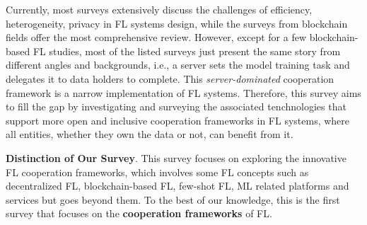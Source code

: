 Currently, most surveys extensively discuss the challenges of efficiency, heterogeneity, privacy in FL systems design, while the surveys from blockchain fields offer the most comprehensive review\textsuperscript{}. 
However, except for a few blockchain-based FL studies, most of the listed surveys just present the same story from different angles and backgrounds, i.e., a server sets the model training task and delegates it to data holders to complete. 
This \textit{server-dominated} cooperation framework is a narrow implementation of FL systems.
Therefore, this survey aims to fill the gap by investigating and surveying the associated tenchnologies that support more open and inclusive cooperation frameworks in FL systems, where all entities, whether they own the data or not, can benefit from it. 

\textbf{Distinction of Our Survey}.
This survey focuses on exploring the innovative FL cooperation frameworks, which involves some FL concepts such as decentralized FL, blockchain-based FL, few-shot FL, ML related platforms and services but goes beyond them.
To the best of our knowledge, this is the first survey that focuses on the \textbf{cooperation frameworks} of FL\textsuperscript{}.



\begin{comment}
TODO:
given the high scalability of modern edge computing networks, a single MEC server cannot manage to aggregate all updates offloaded from millions of devices.
Therefore, there is an urgent need to develop a more decentralized FL approach without using a central server so as to solve security and scalability issues for enabling the next generation intelligent edge networks.
\end{comment}



